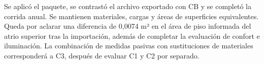 Se aplicó el paquete, se contrastó el archivo exportado con CB y se completó la corrida anual. Se mantienen materiales, cargas y áreas de superficies equivalentes. Queda por aclarar una diferencia de 0,0074 m² en el área de piso informada del atrio superior tras la importación, además de completar la evaluación de confort e iluminación. La combinación de medidas pasivas con sustituciones de materiales corresponderá a C3, después de evaluar C1 y C2 por separado.

\par\medskip
